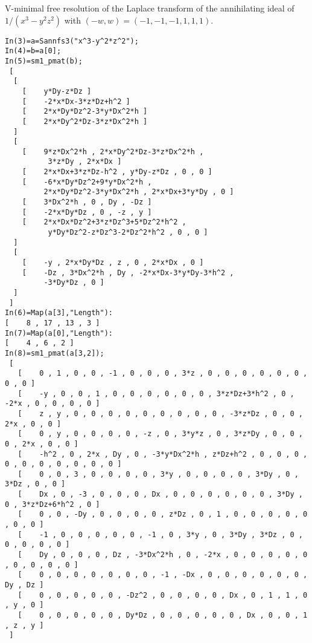 \documentclass{slides}
\begin{document}
V-minimal free resolution
of the Laplace transform of
the annihilating ideal of $1/(x^3-y^2 z^2)$
with $(-w,w) = (-1,-1,-1,1,1,1)$.

{\footnotesize
\begin{verbatim}
In(3)=a=Sannfs3("x^3-y^2*z^2");
In(4)=b=a[0];
In(5)=sm1_pmat(b);
 [ 
  [ 
    [    y*Dy-z*Dz ] 
    [    -2*x*Dx-3*z*Dz+h^2 ] 
    [    2*x*Dy*Dz^2-3*y*Dx^2*h ] 
    [    2*x*Dy^2*Dz-3*z*Dx^2*h ] 
  ]
  [ 
    [    9*z*Dx^2*h , 2*x*Dy^2*Dz-3*z*Dx^2*h , 
          3*z*Dy , 2*x*Dx ] 
    [    2*x*Dx+3*z*Dz-h^2 , y*Dy-z*Dz , 0 , 0 ] 
    [    -6*x*Dy*Dz^2+9*y*Dx^2*h , 
         2*x*Dy*Dz^2-3*y*Dx^2*h , 2*x*Dx+3*y*Dy , 0 ] 
    [    3*Dx^2*h , 0 , Dy , -Dz ] 
    [    -2*x*Dy*Dz , 0 , -z , y ] 
    [    2*x*Dx*Dz^2+3*z*Dz^3+5*Dz^2*h^2 , 
          y*Dy*Dz^2-z*Dz^3-2*Dz^2*h^2 , 0 , 0 ] 
  ]
  [ 
    [    -y , 2*x*Dy*Dz , z , 0 , 2*x*Dx , 0 ] 
    [    -Dz , 3*Dx^2*h , Dy , -2*x*Dx-3*y*Dy-3*h^2 , 
         -3*Dy*Dz , 0 ] 
  ]
 ]
In(6)=Map(a[3],"Length"):
[    8 , 17 , 13 , 3 ] 
In(7)=Map(a[0],"Length"):
[    4 , 6 , 2 ] 
In(8)=sm1_pmat(a[3,2]);
 [ 
   [    0 , 1 , 0 , 0 , -1 , 0 , 0 , 0 , 3*z , 0 , 0 , 0 , 0 , 0 , 0 , 0 , 0 ] 
   [    -y , 0 , 0 , 1 , 0 , 0 , 0 , 0 , 0 , 0 , 3*z*Dz+3*h^2 , 0 , -2*x , 0 , 0 , 0 , 0 ] 
   [    z , y , 0 , 0 , 0 , 0 , 0 , 0 , 0 , 0 , 0 , -3*z*Dz , 0 , 0 , 2*x , 0 , 0 ] 
   [    0 , y , 0 , 0 , 0 , 0 , -z , 0 , 3*y*z , 0 , 3*z*Dy , 0 , 0 , 0 , 2*x , 0 , 0 ] 
   [    -h^2 , 0 , 2*x , Dy , 0 , -3*y*Dx^2*h , z*Dz+h^2 , 0 , 0 , 0 , 0 , 0 , 0 , 0 , 0 , 0 , 0 ] 
   [    0 , 0 , 3 , 0 , 0 , 0 , 0 , 3*y , 0 , 0 , 0 , 0 , 3*Dy , 0 , 3*Dz , 0 , 0 ] 
   [    Dx , 0 , -3 , 0 , 0 , 0 , Dx , 0 , 0 , 0 , 0 , 0 , 0 , 3*Dy , 0 , 3*z*Dz+6*h^2 , 0 ] 
   [    0 , 0 , -Dy , 0 , 0 , 0 , 0 , z*Dz , 0 , 1 , 0 , 0 , 0 , 0 , 0 , 0 , 0 ] 
   [    -1 , 0 , 0 , 0 , 0 , 0 , -1 , 0 , 3*y , 0 , 3*Dy , 3*Dz , 0 , 0 , 0 , 0 , 0 ] 
   [    Dy , 0 , 0 , 0 , Dz , -3*Dx^2*h , 0 , -2*x , 0 , 0 , 0 , 0 , 0 , 0 , 0 , 0 , 0 ] 
   [    0 , 0 , 0 , 0 , 0 , 0 , 0 , -1 , -Dx , 0 , 0 , 0 , 0 , 0 , 0 , Dy , Dz ] 
   [    0 , 0 , 0 , 0 , 0 , -Dz^2 , 0 , 0 , 0 , 0 , Dx , 0 , 1 , 1 , 0 , y , 0 ] 
   [    0 , 0 , 0 , 0 , 0 , Dy*Dz , 0 , 0 , 0 , 0 , 0 , Dx , 0 , 0 , 1 , z , y ] 
 ]
\end{verbatim} }
\end{document}
